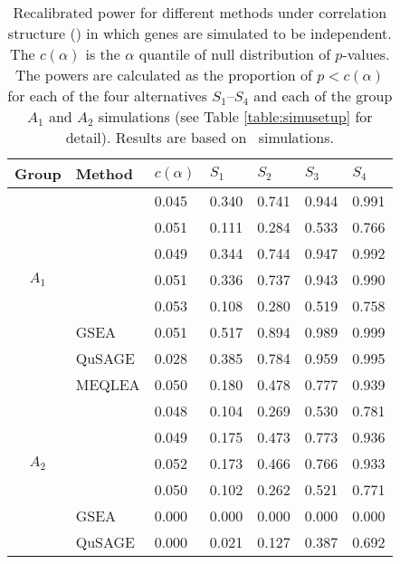 	\begin{table}[!ht]
		\centering
		\caption[Recalibrated power for different methods]{Recalibrated power for different 
		methods under correlation structure (\aaCase) in which genes are simulated to be 
		independent. The $c(\alpha)$ is the $\alpha$ quantile of null distribution of $p$-values. 
		The powers are calculated as the proportion of $p<c(\alpha)$ for each of the four 
		alternatives $S_1$--$S_4$ and each of the group $A_1$ and $A_2$ simulations (see Table 
		\ref{table:simusetup} for detail). Results are based on \HowmanySimu~simulations.
		}\label{table:power}
		\begin{tabular}{cp{3cm}p{1.5cm}p{1.5cm}p{1.5cm}p{1.5cm}p{1.5cm}}
			\hline
			Group & Method &$c(\alpha)$	& $S_1$ & $S_2$ & $S_3$	&$S_4$  \\ 
			\hline
			\multirow{7}{*}{$A_1$} & \OurMethod & 0.045 & 0.340 & 0.741 & 0.944 & 0.991 \\ 
			&	\genr  & 0.051 & 0.111 & 0.284 & 0.533 & 0.766 \\ 
			&	\gent & 0.049 & 0.344 & 0.744 & 0.947 & 0.992 \\ 
			&	\CMT  & 0.051 & 0.336 & 0.737 & 0.943 & 0.990 \\ 
			&	\CMR  & 0.053 & 0.108 & 0.280 & 0.519 & 0.758 \\ 
			&	GSEA & 0.051 & 0.517 & 0.894 & 0.989 & 0.999 \\ 
			&	QuSAGE & 0.028 & 0.385 & 0.784 & 0.959 & 0.995 \\ 
		\hline
			\multirow{7}{*}{$A_2$} &	MEQLEA & 0.050 & 0.180 & 0.478 & 0.777 & 0.939 \\ 
			&		\genr & 0.048 & 0.104 & 0.269 & 0.530 & 0.781 \\ 
			&		\gent & 0.049 & 0.175 & 0.473 & 0.773 & 0.936 \\  
			&		\CMT & 0.052 & 0.173 & 0.466 & 0.766 & 0.933 \\ 
			&		\CMR & 0.050 & 0.102 & 0.262 & 0.521 & 0.771 \\ 
			&		GSEA & 0.000 & 0.000 & 0.000 & 0.000 & 0.000 \\ 
			&		QuSAGE  & 0.000 & 0.021 & 0.127 & 0.387 & 0.692 \\ 
		\hline
		\end{tabular}
	\end{table}
	
	
	
